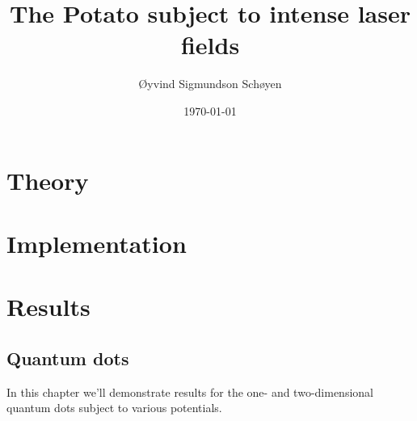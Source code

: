 \documentclass[twoside, english, notitlepage, 12pt]{uiofysmaster}
\author{Øyvind Sigmundson Schøyen}
\title{The Potato subject to intense laser fields}
\date{\today}
\begin{document}
\frontmatter
    \maketitle

    \begin{abstract}
        
    \end{abstract}

    \begin{acknowledgements}
        
    \end{acknowledgements}

    \tableofcontents
    \listoffigures
    \listoftables

\mainmatter

    

    \part{Theory}
        
        

        
        
        

        

        

    \part{Implementation}
    \part{Results}
        
        \chapter{Quantum dots}
            In this chapter we'll demonstrate results for the one- and
            two-dimensional quantum dots subject to various potentials.
\end{document}
